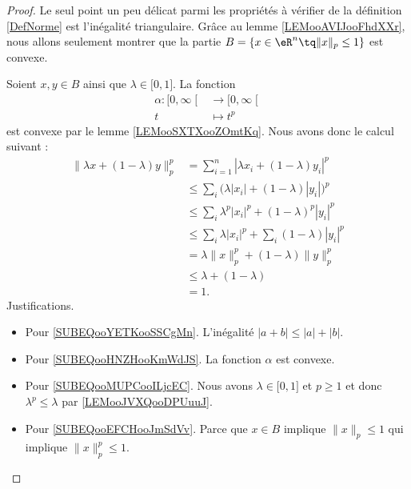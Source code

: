 \begin{proof}
	Le seul point un peu délicat parmi les propriétés à vérifier de la définition \ref{DefNorme} est l'inégalité triangulaire. Grâce au lemme \ref{LEMooAVIJooFhdXXr}, nous allons seulement montrer que la partie \( B=\{ x\in \eR^n\tq \| x \|_p\leq 1 \}\) est convexe.

	Soient \( x,y\in B\) ainsi que \( \lambda\in \mathopen[ 0 , 1 \mathclose]\). La fonction
	\begin{equation}
		\begin{aligned}
			\alpha\colon \mathopen[ 0 , \infty \mathclose[ & \to \mathopen[ 0 , \infty \mathclose[ \\
			t                                              & \mapsto t^p
		\end{aligned}
	\end{equation}
	est convexe par le lemme \ref{LEMooSXTXooZOmtKq}. Nous avons donc le calcul suivant :
	\begin{subequations}
		\begin{align}
			\| \lambda x+(1-\lambda)y \|_p^p & =\sum_{i=1}^n| \lambda x_i+(1-\lambda)y_i |^p                                             \\
			                                 & \leq  \sum_i\big( \lambda| x_i |+(1-\lambda)| y_i | \big)^p   \label{SUBEQooYETKooSSCgMn} \\
			                                 & \leq  \sum_i\lambda^p| x_i |^p+(1-\lambda)^p| y_i |^p         \label{SUBEQooHNZHooKmWdJS} \\
			                                 & \leq  \sum_i \lambda| x_i |^p+\sum_i(1-\lambda)| y_i |^p      \label{SUBEQooMUPCooILjcEC} \\
			                                 & =   \lambda\| x \|_p^p+(1-\lambda)\| y \|_p^p                                             \\
			                                 & \leq  \lambda+(1-\lambda)       \label{SUBEQooEFCHooJmSdVv}                               \\
			                                 & =   1.
		\end{align}
	\end{subequations}
	Justifications.
	\begin{itemize}
		\item Pour \eqref{SUBEQooYETKooSSCgMn}. L'inégalité \( | a+b |\leq | a |+| b |\).
		\item Pour \eqref{SUBEQooHNZHooKmWdJS}. La fonction \( \alpha\) est convexe.
		\item Pour \eqref{SUBEQooMUPCooILjcEC}. Nous avons \( \lambda\in\mathopen[ 0 , 1 \mathclose]\) et \( p\geq 1\) et donc \( \lambda^p\leq \lambda\) par \ref{LEMooJVXQooDPUuuJ}.
		\item Pour \eqref{SUBEQooEFCHooJmSdVv}. Parce que \( x\in B\) implique \( \| x \|_p\leq 1\) qui implique  \( \| x \|_p^p\leq 1\).
	\end{itemize}
\end{proof}

